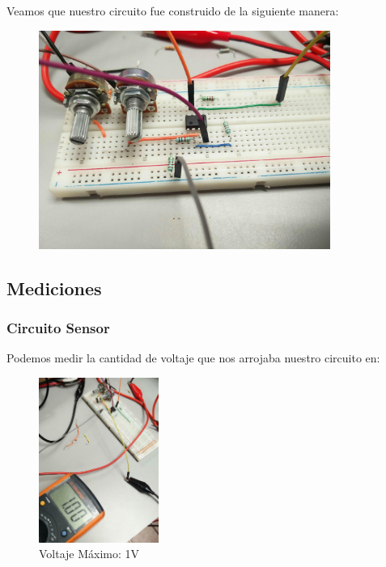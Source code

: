 \documentclass[12pt, fleqn]{article}                            %
\theoremstyle{break}                                            %
\begin{document}
        Veamos que nuestro circuito fue construido de la siguiente manera:
        \begin{figure}[h]
            \centering
            \includegraphics[width=0.85\textwidth]{CircuitoGeneral2}
        \end{figure}


    \clearpage
    \subsection{Mediciones}


        \subsubsection{Circuito Sensor}

            Podemos medir la cantidad de voltaje que nos arrojaba nuestro circuito 
            en:
            \begin{figure}[h]
                \centering
                \includegraphics[width=0.35\textwidth]{Medicion1VoltajeMax}
                \caption{Voltaje Máximo: 1V}
            \end{figure}
\end{document}

